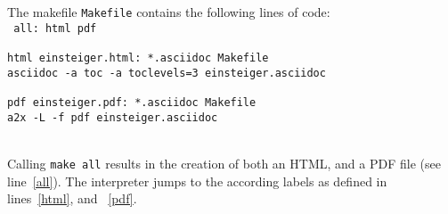 \documentclass{article}
\begin{document}
\noindent The makefile \texttt{Makefile} contains the following lines of code: \\


\linenumbers
\noindent\texttt{%
all: html pdf \\
~\\
html einsteiger.html: *.asciidoc Makefile \\
asciidoc -a toc -a toclevels=3 einsteiger.asciidoc \\
~\\
pdf einsteiger.pdf: *.asciidoc Makefile \\
a2x -L -f pdf einsteiger.asciidoc
}

\nolinenumbers
~\\
Calling \texttt{make all} results in the creation of both an HTML, and a
PDF file (see line~\ref{all}). The interpreter jumps to the according
labels as defined in lines~\ref{html}, and ~\ref{pdf}.

\end{document}
